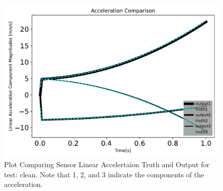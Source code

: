 \begin{figure}[htbp]\centerline{\includegraphics[height=0.7\textwidth, keepaspectratio]{AutoTeX/cleanaccelComparison}}\caption{Plot Comparing Sensor Linear Accelertaion Truth and Output for test: clean. Note that 1, 2, and 3 indicate the components of the acceleration.}\label{fig:cleanaccelComparison}\end{figure}